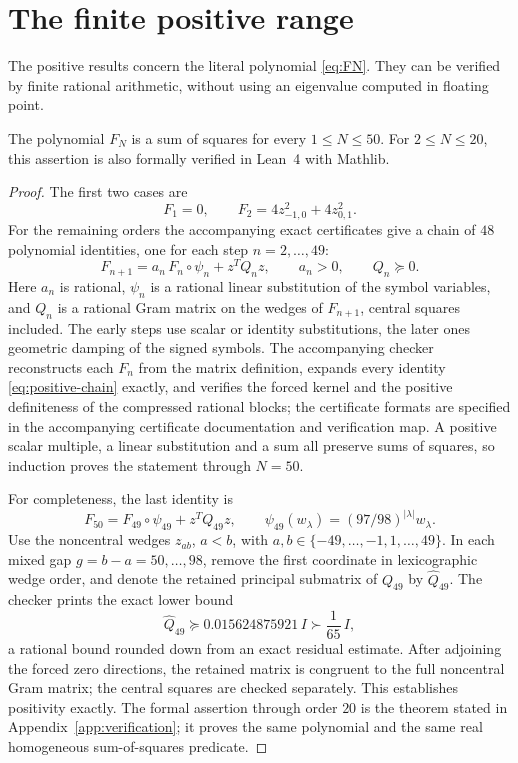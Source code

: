 \section{The finite positive range}\label{sec:positive}
The positive results concern the literal polynomial
\eqref{eq:FN}. They can be verified by finite rational arithmetic, without
using an eigenvalue computed in floating point.

\begin{proposition}\label{prop:positive}
The polynomial $F_N$ is a sum of squares for every $1\le N\le50$.
For $2\le N\le20$, this assertion is also formally verified in Lean~4
with Mathlib.
\end{proposition}
\begin{proof}
The first two cases are
\[
 F_1=0,\qquad
 F_2=4z_{-1,0}^2+4z_{0,1}^2.
\]
For the remaining orders the accompanying exact certificates give a
chain of $48$ polynomial identities, one for each step
$n=2,\ldots,49$:
\begin{equation}\label{eq:positive-chain}
 F_{n+1}=a_n\,F_n\circ\psi_n+z^TQ_nz,
 \qquad a_n>0,\qquad Q_n\succeq0.
\end{equation}
Here $a_n$ is rational, $\psi_n$ is a rational linear substitution of
the symbol variables, and $Q_n$ is a rational Gram matrix on the wedges
of $F_{n+1}$, central squares included. The early steps use scalar or
identity substitutions, the later ones geometric damping of the signed
symbols. The accompanying checker reconstructs each $F_n$ from the
matrix definition, expands every identity \eqref{eq:positive-chain}
exactly, and verifies the forced kernel and the positive definiteness of
the compressed rational blocks; the certificate formats are specified in
the accompanying certificate documentation and verification map. A
positive scalar multiple, a linear substitution and a sum all preserve
sums of squares, so induction proves the statement through $N=50$.

For completeness, the last identity is
\begin{equation}\label{eq:last-positive}
 F_{50}=F_{49}\circ\psi_{49}+z^TQ_{49}z,\qquad
 \psi_{49}(w_\lambda)=(97/98)^{|\lambda|}w_\lambda.
\end{equation}
Use the noncentral wedges $z_{ab}$, $a<b$, with
$a,b\in\{-49,\ldots,-1,1,\ldots,49\}$. In each mixed gap
$g=b-a=50,\ldots,98$, remove the first coordinate in lexicographic
wedge order, and denote the retained principal submatrix of $Q_{49}$ by
$\widehat Q_{49}$. The checker prints the exact lower bound
\[
 \widehat Q_{49}\succeq0.015624875921\,I\succ\frac1{65}\,I,
\]
a rational bound rounded down from an exact residual estimate. After
adjoining the forced zero directions, the retained matrix is congruent
to the full noncentral Gram matrix; the central squares are checked
separately. This establishes positivity exactly.
The formal assertion through order $20$ is the theorem stated in
Appendix~\ref{app:verification}; it proves the same polynomial and the
same real homogeneous sum-of-squares predicate.
\end{proof}

